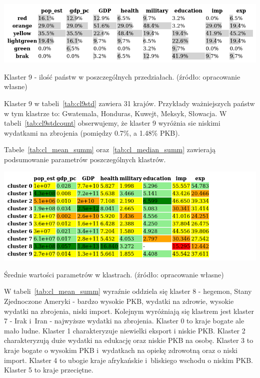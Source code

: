 \documentclass[11pt]{report}
\begin{document}
    \begin{table}[!htp]
        \centering
        \includegraphics[width=\linewidth]{tables/CLUST/cluster9stdkmeanscount.png}
        \caption{Klaster 9 - ilość państw w poszczególnych przedziałach. (źródło: opracowanie własne)}
        \label{tab:cl9stdcount}
    \end{table}

    Klaster 9 w tabeli~\ref{tab:cl9std} zawiera 31 krajów.
    Przykłady ważniejszych państw w tym klastrze to: Gwatemala, Honduras, Kuwejt, Meksyk, Słowacja.
    W tabeli~\ref{tab:cl9stdcount} obserwujemy, że klaster 9 wyróżnia sie niskimi wydatkami na zbrojenia (pomiędzy 0.7\%, a 1.48\% PKB).

    Tabele~\ref{tab:cl_mean_summ} oraz~\ref{tab:cl_median_summ} zawierają podsumowanie parametrów poszczególnych klastrów.

    \begin{table}[!htp]
        \centering
        \includegraphics[width=\linewidth]{tables/CLUST/desc/cluster_mean_summary.png}
        \caption{Średnie wartości parametrów w klastrach. (źródło: opracowanie własne)}
        \label{tab:cl_mean_summ}
    \end{table}

    W tabeli~\ref{tab:cl_mean_summ} wyraźnie oddziela się klaster 8 - hegemon, Stany Zjednoczone Ameryki - bardzo wysokie PKB, wydatki na zdrowie, wysokie wydatki na zbrojenia, niski import.
    Kolejnym wyróżniają się klastrem jest klaster 7 - Irak i~Iran - najwyższe wydatki na zbrojenia.
    Klaster 0 to kraje bogate ale mało ludne.
    Klaster 1 charakteryzuje niewielki eksport i niskie PKB.
    Klaster 2 charakteryzują duże wydatki na edukację oraz niskie PKB na osobę.
    Klaster 3 to kraje bogate o wysokim PKB i~wydatkach na opiekę zdrowotną oraz o niski import.
    Klaster 4 to ubogie kraje afrykańskie i~bliskiego wschodu o niskim PKB.
    Klaster 5 to kraje przeciętne.
\end{document}

